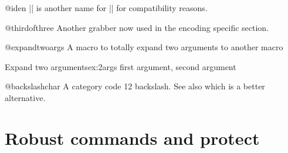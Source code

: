 \begin{teX}
\long{}
\long{}
\long{}
\end{teX}

\begin{docCommand}{@iden}{}
    |\@iden| is another name for |\@firstofone| for
    compatibility reasons.
\begin{macro}{\@iden}   
\begin{teX}
\let\@iden\@firstofone
\end{teX}
\end{macro}
\end{docCommand}


\begin{docCommand}{@thirdofthree}{}
    Another grabber now used in the encoding specific
    section.
\end{docCommand}

\begin{teX}
\long{}
\end{teX}



\begin{docCommand}{@expandtwoargs}{}
 A macro to totally expand two arguments to another macro
   
\begin{teX}
\def\@expandtwoargs#1#2#3{%
   \edef\reserved@a{\noexpand#1{#2}{#3}}\reserved@a}
\end{teX}
\end{docCommand}

\begin{texexample}{Expand two arguments}{ex:2args}
\makeatletter
\bgroup
  \def\test#1#2{#1, #2} 
  \def\xx{first argument}
  \def\yy{second argument}
  \@expandtwoargs\test{\xx}{\yy}
\egroup
\makeatother
\end{texexample}

\begin{docCommand}{@backslashchar}{}
A category code 12 backslash. See also   which is a better alternative.
\begin{teX}
\edef\@backslashchar{\expandafter\@gobble\string\\ }
\end{teX}
\end{docCommand}


 \section{Robust commands and protect}

